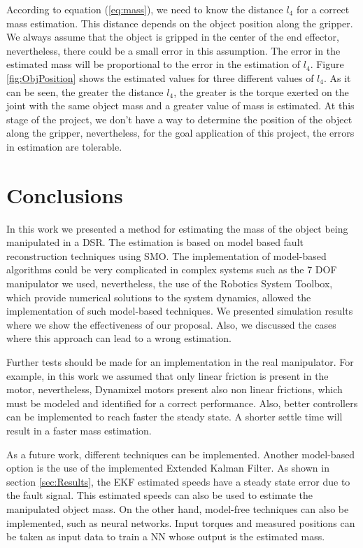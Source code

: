 \documentclass[conference,letterpaper]{ieeeconf}
\begin{document}
According to equation (\ref{eq:mass}), we need to know the distance $l_4$ for a correct mass estimation. This distance depends on the object position along the gripper. We always assume that the object is gripped in the center of the end effector, nevertheless, there could be a small error in this assumption. The error in the estimated mass will be proportional to the error in the estimation of $l_4$. Figure \ref{fig:ObjPosition} shows the estimated values for three different values of $l_4$. As it can be seen, the greater the distance $l_4$, the greater is the torque exerted on the joint with the same object mass and a greater value of mass is estimated. At this stage of the project, we don't have a way to determine the position of the object along the gripper, nevertheless, for the goal application of this project, the errors in estimation are tolerable. 

\section{Conclusions}
\label{sec:Conclusions}
In this work we presented a method for estimating the mass of the object being manipulated in a DSR. The estimation is based on model based fault reconstruction techniques using SMO. The implementation of model-based algorithms could be very complicated in complex systems such as the 7 DOF manipulator we used, nevertheless, the use of the Robotics System Toolbox, which provide numerical solutions to the system dynamics, allowed the implementation of such model-based techniques. We presented simulation results where we show the effectiveness of our proposal. Also, we discussed the cases where this approach can lead to a wrong estimation.

Further tests should be made for an implementation in the real manipulator. For example, in this work we assumed that only linear friction is present in the motor, nevertheless, Dynamixel motors present also non linear frictions, which must be modeled and identified for a correct performance. Also, better controllers can be implemented to reach faster the steady state. A shorter settle time will result in a faster mass estimation. 

As a future work, different techniques can be implemented. Another model-based option is the use of the implemented Extended Kalman Filter. As shown in section \ref{sec:Results}, the EKF estimated speeds have a steady state error due to the fault signal. This estimated speeds can also be used to estimate the manipulated object mass. On the other hand, model-free techniques can also be implemented, such as neural networks. Input torques and measured positions can be taken as input data to train a NN whose output is the estimated mass.
\end{document}
